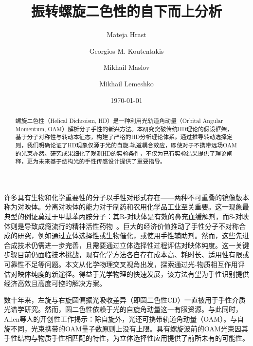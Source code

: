 \documentclass[reprint,aps,prl,twocolumn,superscriptaddress,groupedaddress]{revtex4-2}
\begin{document}
\begin{CJK*}{UTF8}{gbsn}
\title{振转螺旋二色性的自下而上分析}
\author{Mateja Hrast}
\author{Georgios M. Koutentakis}
\author{Mikhail Maslov}
\author{Mikhail Lemeshko}
\date{\today}
\begin{abstract}
螺旋二色性（Helical Dichroism, HD）是一种利用光轨道角动量（Orbital Angular Momentum, OAM）解析分子手性的新兴方法。本研究突破传统HD理论的假设框架，基于分子对称性与转动本征态，构建了严格的HD分析理论体系。通过推导转动选择定则，我们明确论证了HD现象仅源于光的自旋-轨道耦合效应，即使对于不携带远场OAM的光束亦然。研究成果细化了观测HD的实验条件，不仅为已有实验结果提供了理论阐释，更为未来基于结构光的手性传感设计提供了重要指导。
\end{abstract}
\maketitle
许多具有生物和化学重要性的分子以手性对形式存在——两种不可重叠的镜像版本称为对映体。分离对映体的能力对于制药和农用化学品工业至关重要\cite{MAIER2001}。这一现象最典型的例证莫过于甲基苯丙胺分子：其R-对映体是有效的鼻充血缓解剂，而S-对映体则是导致成瘾流行的精神活性药物~\cite{barkholtz2023}。巨大的经济价值推动了手性分子不对称合成的研究，例如通过立体选择性或生物催化，或使用手性辅助剂\cite{Brown1989}。然而，这些先进合成技术仍需进一步完善，且需要通过立体选择性过程评估对映体纯度。这一关键步骤目前仍面临技术挑战，现有化学方法各自存在成本高、耗时长、适用性有限或可靠性不足等问题\cite{qian2023}。本文从化学物理交叉视角出发，探索通过光-物质相互作用评估对映体纯度的新途径。得益于光学物理的快速发展\cite{Koch2019}，该方法有望为手性识别提供经济高效且高度可控的解决方案。

数十年来，左旋与右旋圆偏振光吸收差异（即圆二色性CD）\cite{deutsche1970,Holzwarth1974}一直被用于手性介质光谱学研究\cite{Miles2021}。然而，圆二色性依赖于光的自旋角动量这一有限资源。与此同时，Allen等人\cite{Allen1992}的开创性工作揭示：除自旋外，光还可携带轨道角动量（OAM）。与自旋不同，光束携带的OAM量子数原则上没有上限。具有螺旋波前的OAM光束因其手性结构与物质手性相匹配的特性，为立体选择性应用提供了前所未有的可能性。


\end{CJK*}
\end{document}
